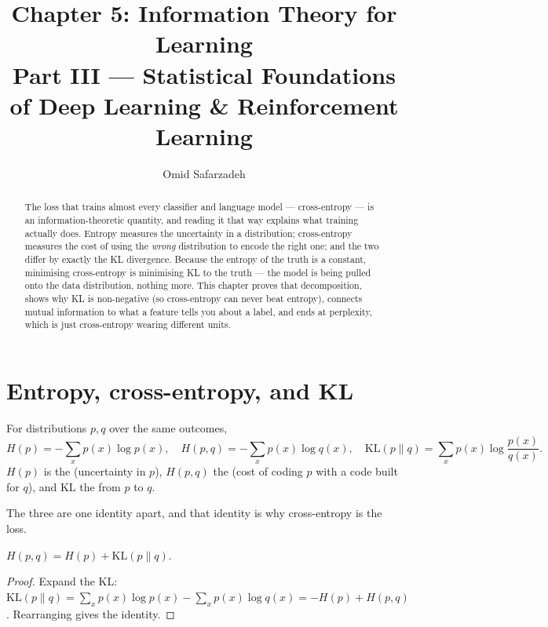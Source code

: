 \documentclass[11pt]{article}
\title{Chapter 5: Information Theory for Learning \\ \large Part III --- Statistical Foundations of Deep Learning \& Reinforcement Learning}
\author{Omid Safarzadeh}
\date{}
\begin{document}
\maketitle

\begin{abstract}
\noindent
The loss that trains almost every classifier and language model --- cross-entropy
--- is an information-theoretic quantity, and reading it that way explains what
training actually does. Entropy measures the uncertainty in a distribution;
cross-entropy measures the cost of using the \emph{wrong} distribution to encode
the right one; and the two differ by exactly the KL divergence. Because the
entropy of the truth is a constant, minimising cross-entropy is minimising KL to
the truth --- the model is being pulled onto the data distribution, nothing more.
This chapter proves that decomposition, shows why KL is non-negative (so
cross-entropy can never beat entropy), connects mutual information to what a
feature tells you about a label, and ends at perplexity, which is just
cross-entropy wearing different units.
\end{abstract}

\tableofcontents

\section{Entropy, cross-entropy, and KL}

\begin{definition}
For distributions $p,q$ over the same outcomes,
\[
  H(p) = -\sum_x p(x)\log p(x),\quad
  H(p,q) = -\sum_x p(x)\log q(x),\quad
  \mathrm{KL}(p\|q) = \sum_x p(x)\log\frac{p(x)}{q(x)}.
\]
$H(p)$ is the  (uncertainty in $p$), $H(p,q)$ the
 (cost of coding $p$ with a code built for $q$), and
$\mathrm{KL}$ the  from $p$ to $q$.
\end{definition}

The three are one identity apart, and that identity is why cross-entropy is the
loss.

\begin{theorem}
$H(p,q) = H(p) + \mathrm{KL}(p\|q)$.
\end{theorem}
\begin{proof}
Expand the KL: $\mathrm{KL}(p\|q) = \sum_x p(x)\log p(x) - \sum_x p(x)\log q(x)
= -H(p) + H(p,q)$. Rearranging gives the identity.
\end{proof}
\end{document}
